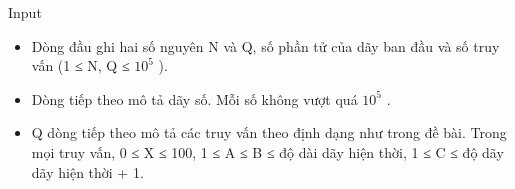 Input
\begin{itemize}
	\item     Dòng đầu ghi hai số nguyên N và Q, số phần tử của dãy ban đầu và số truy vấn (1 ≤ N, Q ≤ $10^{5}$    ).   
	\item     Dòng tiếp theo mô tả dãy số. Mỗi số không vượt quá $10^{5}$    .   
	\item     Q dòng tiếp theo mô tả các truy vấn theo định dạng như trong đề bài. Trong mọi truy vấn, 0 ≤ X ≤ 100, 1 ≤ A ≤ B ≤ độ dài dãy hiện thời, 1 ≤ C ≤ độ dãy dãy hiện thời + 1.   
\end{itemize}